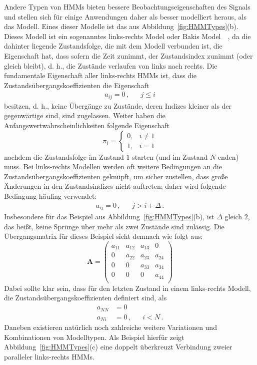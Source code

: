 Andere Typen von \acrshort{HMM}s bieten bessere Beobachtungseigenschaften des Signals und stellen sich f\"ur einige Anwendungen daher als besser modelliert heraus, als das  Modell. Eines dieser Modelle ist das aus  Abbildung~\ref{fig:HMMTypes}(b). Dieses Modell ist ein sogenanntes links-rechts Model oder Bakis Model~\cite{bib:jelinek}~\cite{bib:bakis}, da die dahinter liegende Zustandsfolge, die mit dem Modell verbunden ist, die Eigenschaft hat, dass sofern die Zeit zunimmt, der Zustandsindex zunimmt (oder gleich bleibt), d. h., die Zust\"ande verlaufen von links nach rechts. Die fundamentale Eigenschaft aller links-rechts HMMs ist, dass die Zustands\"ubergangskoeffizienten die Eigenschaft
\begin{align}
a_{ij} = 0 \, , & & j \leq i
\end{align}
besitzen, d. h., keine \"Uberg\"ange zu Zust\"ande, deren Indizes kleiner als der gegenw\"artige sind, sind zugelassen. Weiter haben die Anfangswertwahrscheinlichkeiten folgende Eigenschaft
\[
\pi_i = 
\begin{cases}
	0, & i \ne 1 \\
	1, & i = 1
\end{cases}
\]
nachdem die Zustandsfolge im Zustand $1$ starten (und im Zustand $N$ enden) muss. Bei links-rechts Modellen werden oft weitere Bedingungen an die Zustands\"ubergangskoeffizienten gekn\"upft, um sicher zustellen, dass gro\ss e \"Anderungen in den Zustandsindizes nicht auftreten; daher wird folgende Bedingung h\"aufing verwendet:
\begin{align}
a_{ij} = 0 \, , & & j > i + \varDelta \, .
\end{align}
Insbesondere f\"ur das Beispiel aus Abbildung~\ref{fig:HMMTypes}(b), ist $\varDelta$ gleich $2$, das hei\ss t, keine Spr\"unge \"uber mehr als zwei Zust\"ande sind zul\"assig. Die \"Ubergangsmatrix f\"ur dieses Beispiel sieht demnach wie folgt aus:
\begin{equation}
\mathbf{A} = 
\begin{pmatrix}
a_{11} & a_{12} & a_{13} &0 \\
0 & a_{22} & a_{23} & a_{24} \\
0 & 0 & a_{33} & a_{34} \\
0 & 0 & 0 & a_{44} \\
\end{pmatrix}
\end{equation}
Dabei sollte klar sein, dass f\"ur den letzten Zustand in einem links-rechts Modell, die Zustands\"ubergangskoeffizienten definiert sind, als
\begin{subequations}
\begin{align}
\label{E:TransitionProperties}
a_{NN} &= 0  \\
a_{Ni} &= 0 \, , & & i < N \, . 
\end{align}
\end{subequations}
Daneben existieren nat\"urlich noch zahlreiche weitere Variationen und Kombinationen von Modelltypen. Als Beispiel hierf\"ur zeigt Abbildung~\ref{fig:HMMTypes}(c) eine doppelt \"uberkreuzt Verbindung zweier paralleler links-rechts HMMs.